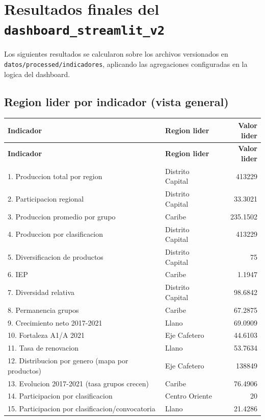 \documentclass[12pt,letterpaper]{article}
\begin{document}
\section{Resultados finales del \texttt{dashboard\_streamlit\_v2}}

Los siguientes resultados se calcularon sobre los archivos versionados en \texttt{datos/processed/indicadores}, aplicando las agregaciones configuradas en la logica del dashboard.

\subsection{Region lider por indicador (vista general)}

\begin{longtable}{p{7.8cm}p{3.4cm}r}
\toprule
\textbf{Indicador} & \textbf{Region lider} & \textbf{Valor lider} \\
\midrule
\endfirsthead
\toprule
\textbf{Indicador} & \textbf{Region lider} & \textbf{Valor lider} \\
\midrule
\endhead
1. Produccion total por region & Distrito Capital & 413229 \\
2. Participacion regional & Distrito Capital & 33.3021 \\
3. Produccion promedio por grupo & Caribe & 235.1502 \\
4. Produccion por clasificacion & Distrito Capital & 413229 \\
5. Diversificacion de productos & Distrito Capital & 75 \\
6. IEP & Caribe & 1.1947 \\
7. Diversidad relativa & Distrito Capital & 98.6842 \\
8. Permanencia grupos & Caribe & 67.2875 \\
9. Crecimiento neto 2017-2021 & Llano & 69.0909 \\
10. Fortaleza A1/A 2021 & Eje Cafetero & 44.6103 \\
11. Tasa de renovacion & Llano & 53.7634 \\
12. Distribucion por genero (mapa por productos) & Eje Cafetero & 138849 \\
13. Evolucion 2017-2021 (tasa grupos crecen) & Caribe & 76.4906 \\
14. Participacion por clasificacion & Centro Oriente & 20 \\
15. Participacion por clasificacion/convocatoria & Llano & 21.4286 \\
\bottomrule
\end{longtable}
\end{document}
